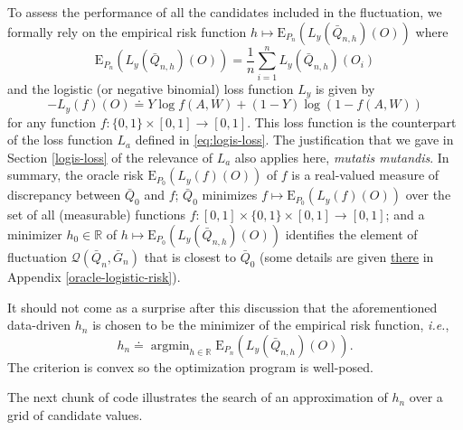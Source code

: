 \documentclass[
  11pt,
  openright,twoside]{book}
\newcommand{\bbR}{\mathbb{R}}
\newcommand{\defq}{\doteq}
\newcommand{\calQ}{\mathcal{Q}}
\newcommand{\Exp}{\textrm{E}}
\newcommand{\Gbar}{\bar{G}}
\newcommand{\Qbar}{\bar{Q}}
\theoremstyle{definition}
\theoremstyle{definition}
\theoremstyle{definition}
\theoremstyle{definition}
\theoremstyle{remark}
\begin{document}
To assess the performance of all the candidates included in the fluctuation,
we formally rely on the empirical risk function \(h \mapsto \Exp_{P_{n}} \left(L_{y} (\Qbar_{n,h})(O)\right)\) where \begin{equation*}\Exp_{P_{n}}
\left(L_{y}   (\Qbar_{n,h})(O)\right)  =   \frac{1}{n}  \sum_{i=1}^{n}   L_{y}
(\Qbar_{n,h})(O_{i})\end{equation*} and the logistic (or negative binomial)
loss function \(L_{y}\) is given by
\begin{equation*} 
-L_{y}(f)(O) \defq Y
\log f(A,W) + (1 - Y) \log \left(1 - f(A,W)\right) \label{eq:logis-loss-y}
\end{equation*}
for any function \(f:\{0,1\} \times [0,1] \to [0,1]\). This loss
function is the counterpart of the loss function \(L_{a}\) defined in
\eqref{eq:logis-loss}. The justification that we gave in Section
\ref{logis-loss} of the relevance of \(L_{a}\) also applies here, \emph{mutatis
mutandis}. In summary, the oracle risk \(\Exp_{P_{0}} \left(L_{y} (f)(O)\right)\) of \(f\) is a real-valued measure of discrepancy between
\(\Qbar_{0}\) and \(f\); \(\Qbar_{0}\) minimizes \(f \mapsto \Exp_{P_{0}} \left(L_{y} (f)(O)\right)\) over the set of all (measurable) functions \(f:[0,1] \times \{0,1\} \times [0,1] \to [0,1]\); and a minimizer \(h_{0} \in \bbR\) of \(h \mapsto \Exp_{P_{0}} \left(L_{y} (\Qbar_{n,h})(O)\right)\) identifies the
element of fluctuation \(\calQ(\Qbar_{n}, \Gbar_{n})\) that is closest to
\(\Qbar_{0}\) (some details are given \protect\hyperlink{oracle-logistic-risk}{there} in Appendix
\ref{oracle-logistic-risk}).

It should not come as a surprise after this discussion that the aforementioned
data-driven \(h_{n}\) is chosen to be the minimizer of the empirical risk
function, \emph{i.e.}, \begin{equation*}h_{n} \defq  \mathop{\arg\min}_{h \in
\bbR}  \Exp_{P_{n}}  \left(L_{y}  (\Qbar_{n,h})(O)\right).\end{equation*} The
criterion is convex so the optimization program is well-posed.

The next chunk of code illustrates the search of an approximation of \(h_{n}\)
over a grid of candidate values.
\end{document}
